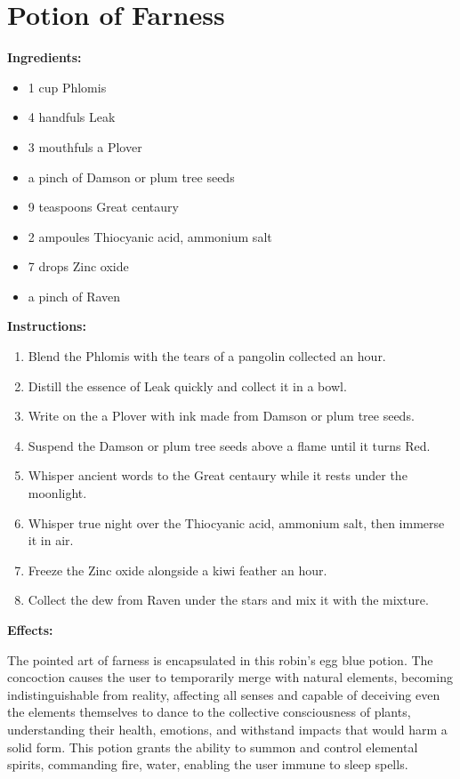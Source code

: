 \documentclass{article}
\begin{document}
\newpage
\section*{Potion of Farness}

\textbf{Ingredients:}

\begin{itemize}
  \item 1 cup Phlomis
  \item 4 handfuls Leak
  \item 3 mouthfuls a Plover
  \item a pinch of Damson or plum tree seeds
  \item 9 teaspoons Great centaury
  \item 2 ampoules Thiocyanic acid, ammonium salt
  \item 7 drops Zinc oxide
  \item a pinch of Raven
\end{itemize}

\textbf{Instructions:}

\begin{enumerate}
  \item Blend the Phlomis with the tears of a pangolin collected an hour.
  \item Distill the essence of Leak quickly and collect it in a bowl.
  \item Write on the a Plover with ink made from Damson or plum tree seeds.
  \item Suspend the Damson or plum tree seeds above a flame until it turns Red.
  \item Whisper ancient words to the Great centaury while it rests under the moonlight.
  \item Whisper true night over the Thiocyanic acid, ammonium salt, then immerse it in air.
  \item Freeze the Zinc oxide alongside a kiwi feather an hour.
  \item Collect the dew from Raven under the stars and mix it with the mixture.
\end{enumerate}

\textbf{Effects:}

The pointed art of farness is encapsulated in this robin's egg blue potion. The concoction causes the user to temporarily merge with natural elements, becoming indistinguishable from reality, affecting all senses and capable of deceiving even the elements themselves to dance to the collective consciousness of plants, understanding their health, emotions, and withstand impacts that would harm a solid form. This potion grants the ability to summon and control elemental spirits, commanding fire, water, enabling the user immune to sleep spells.
\end{document}
